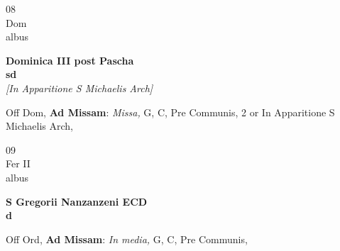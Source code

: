 \documentclass[10pt, openany]{book}
\begin{document}
        \begin{center}
            \begin{minipage}{3.5in}
                \vspace{2em}
                \begin{minipage}{0.5in}
                    {\Huge 08} \\
                    {\normalsize Dom} \\
                    {\normalsize albus}
                \end{minipage}
                \begin{minipage}{3.0in}
                    \textbf{ \large Dominica III post Pascha \\
                    \textnormal{\normalsize sd}} \\ \textit{[In Apparitione S Michaelis Arch]} \\ 
                \end{minipage}
                \begin{justify}Off Dom, \textbf{Ad Missam}: \textit{Missa,} G, C, Pre Communis, 2 or In Apparitione S Michaelis Arch,   
                \end{justify}
            \end{minipage}
        \end{center}
    
        \begin{center}
            \begin{minipage}{3.5in}
                \vspace{2em}
                \begin{minipage}{0.5in}
                    {\Huge 09} \\
                    {\normalsize Fer II} \\
                    {\normalsize albus}
                \end{minipage}
                \begin{minipage}{3.0in}
                    \textbf{ \large S Gregorii Nanzanzeni ECD \\
                    \textnormal{\normalsize d}} \\ 
                \end{minipage}
                \begin{justify}Off Ord, \textbf{Ad Missam}: \textit{In media,} G, C, Pre Communis,   
                \end{justify}
            \end{minipage}
        \end{center}
    
\end{document}
